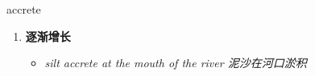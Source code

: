 
\begin{frame}
{\huge accrete}
\begin{center}
\begin{enumerate}\Large
  \item \textbf{逐渐增长}
  \begin{itemize}
    \item \em{\Large{silt accrete at the mouth of the river 泥沙在河口淤积}}
  \end{itemize}
\end{enumerate}
\end{center}
\end{frame}
